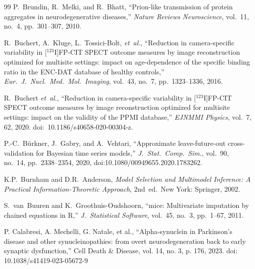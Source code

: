 \begin{thebibliography}{99}
P.~Brundin, R.~Melki, and R.~Bhatt, ``Prion-like transmission of protein aggregates in neurodegenerative diseases,'' \textit{Nature Reviews Neuroscience}, vol.~11, no.~4, pp.~301--307, 2010.

R.~Buchert, A.~Kluge, L.~Tossici-Bolt, \textit{et~al.}, ``Reduction in camera-specific variability in [$^{123}$I]FP-CIT SPECT outcome measures by image reconstruction optimized for multisite settings: impact on age-dependence of the specific binding ratio in the ENC-DAT database of healthy controls,'' \textit{Eur.\ J.\ Nucl.\ Med.\ Mol.\ Imaging}, vol.~43, no.~7, pp.~1323--1336, 2016.

R.~Buchert \textit{et~al.}, ``Reduction in camera-specific variability in [$^{123}$I]FP-CIT SPECT outcome measures by image reconstruction optimized for multisite settings: impact on the validity of the PPMI database,'' \textit{EJNMMI Physics}, vol.~7, 62, 2020. doi:~10.1186/s40658-020-00304-z.

P.-C.~B{\"u}rkner, J.~Gabry, and A.~Vehtari, ``Approximate leave-future-out cross-validation for Bayesian time series models,'' \textit{J.\ Stat.\ Comp.\ Sim.}, vol.~90, no.~14, pp.~2338--2354, 2020, doi:10.1080/00949655.2020.1783262.

K.P.~Burnham and D.R.~Anderson, \textit{Model Selection and Multimodel
Inference: A Practical Information-Theoretic Approach}, 2nd~ed.\
New York: Springer, 2002.

S.~van~Buuren and K.~Groothuis-Oudshoorn, ``mice: Multivariate imputation by chained equations in R,'' \textit{J.\ Statistical Software}, vol.~45, no.~3, pp.~1--67, 2011.


 P. Calabresi, A. Mechelli, G. Natale, et al., ``Alpha-synuclein in Parkinson's disease and other synucleinopathies: from overt neurodegeneration back to early synaptic dysfunction,'' Cell Death \& Disease, vol. 14, no. 3, p. 176, 2023. doi: 10.1038/s41419-023-05672-9








\end{thebibliography}
